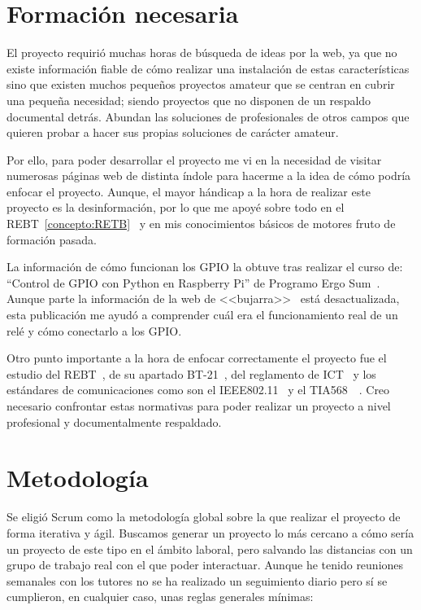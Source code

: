 \section{Formación necesaria}
El proyecto requirió muchas horas de búsqueda de ideas por la web, ya que no existe información fiable de cómo realizar una instalación de estas características sino que existen muchos pequeños proyectos amateur que se centran en cubrir una pequeña necesidad; siendo proyectos que no disponen de un respaldo documental detrás. Abundan las soluciones de profesionales de otros campos que quieren probar a hacer sus propias soluciones de carácter amateur.

Por ello, para poder desarrollar el proyecto me vi en la necesidad de visitar numerosas páginas web de distinta índole para hacerme a la idea de cómo podría enfocar el proyecto. Aunque, el mayor hándicap a la hora de realizar este proyecto es la desinformación, por lo que me apoyé sobre todo en el REBT~\ref{concepto:RETB}~\cite{manual:REBT} y en mis conocimientos básicos de motores fruto de formación pasada.

La información de cómo funcionan los GPIO la obtuve tras realizar el curso de: “Control de GPIO con Python en Raspberry Pi” de Programo Ergo Sum~\cite{misc:programoergosum}.
Aunque parte la información de la web de <<bujarra>>~\cite{misc:BujarraGPIO} está desactualizada, esta publicación me ayudó a comprender cuál era el funcionamiento real de un relé y cómo conectarlo a los GPIO.

Otro punto importante a la hora de enfocar correctamente el proyecto fue el estudio del REBT~\cite{manual:REBT}, de su apartado BT-21~\cite{manual:ICT-BT-21}, del reglamento de ICT~\cite{manual:ICT} y los estándares de comunicaciones como son el IEEE802.11~\cite{manual:IEEE802.11} y el TIA568~\cite{manual:568.1}~\cite{manual:568.2}. Creo necesario confrontar estas normativas para poder realizar un proyecto a nivel profesional y documentalmente respaldado.

\section{Metodología}
Se eligió Scrum como la metodología global sobre la que realizar el proyecto de forma iterativa y ágil. Buscamos generar un proyecto lo más cercano a cómo sería un proyecto de este tipo en el ámbito laboral, pero salvando las distancias con un grupo de trabajo real con el que poder interactuar. Aunque he tenido reuniones semanales con los tutores no se ha realizado un seguimiento diario pero sí se cumplieron, en cualquier caso, unas reglas generales mínimas:

